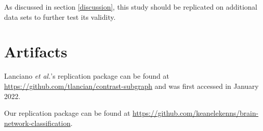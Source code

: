 \documentclass[sigconf]{acmart}
\begin{document}
As discussed in section \ref{discussion}, this study should be replicated on additional data sets to further test its validity.


\appendix

\section{Artifacts} \label{artifacts}

Lanciano \emph{et al.}'s replication package can be found at \url{https://github.com/tlancian/contrast-subgraph} and was first accessed in January 2022.

Our replication package can be found at \url{https://github.com/keanelekenns/brain-network-classification}.



\end{document}
